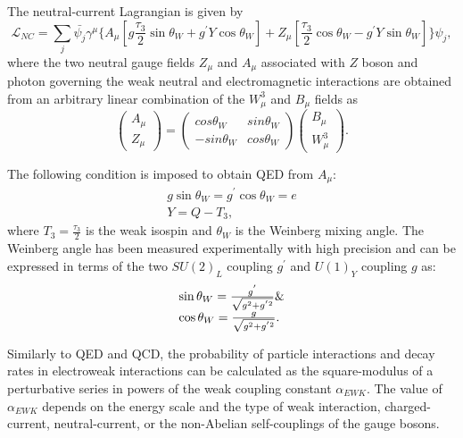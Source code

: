 The neutral-current Lagrangian is given by 
\begin{equation}
\mathcal{L}_{NC} = \sum_{j}{ \bar{\psi_{j}} \gamma^{\mu} \{ A_{\mu} [ g \frac{\tau_{3}}{2} \sin\theta_{W} + g^{'} Y \cos\theta_{W} ] + Z_{\mu} [ \frac{\tau_{3}}{2} \cos\theta_{W} - g^{'} Y \sin\theta_{W}] \} \psi_{j} },
\label{eqn:SU2NCLag}
\end{equation}
where the two neutral gauge fields $Z_{\mu}$ and $A_{\mu}$ associated with $Z$ boson and photon governing the weak neutral and electromagnetic interactions are obtained from an arbitrary linear combination of the $W^{3}_{\mu}$ and $B_{\mu}$ fields as 
\begin{equation}
\begin{pmatrix} A_{\mu} \\ Z_{\mu} \end{pmatrix} =  \begin{pmatrix} cos{\theta_{W}} & sin{\theta_{W}} \\ -sin{\theta_{W}} & cos{\theta_{W}} \end{pmatrix} \begin{pmatrix} B_{\mu} \\ W^{3}_{\mu} \end{pmatrix}.
\label{eqn:NeutralGaugeBosons}
\end{equation}

The following condition is imposed to obtain QED from $A_{\mu}$:
\begin{equation}
\begin{array}{l}
g \sin\theta_{W} = g^{'} \cos\theta_{W} = e \\ 
Y= Q - T_{3},
\end{array}
\label{eqn:QEDFromEWk}
\end{equation}
where $T_{3}=\frac{\tau_{3}}{2}$ is the weak isospin and $\theta_{W}$ is the Weinberg mixing angle. The Weinberg angle has been measured experimentally with high precision and can be expressed in terms of the two $SU(2)_{L}$ coupling $g^{'}$ and $U(1)_{Y}$ coupling $g$ as:
\begin{equation}
\begin{array}{l}
\sin\theta_{W} = \frac{g^{'}}{\sqrt{g^{2} +  g^{'2} }} $\&$ \\ \cos\theta_{W} = \frac{g}{\sqrt{g^{2} +  g^{'2} }}.
\end{array}
\label{eqn:WeinbergAngle}
\end{equation}

Similarly to QED and QCD, the probability of particle interactions and decay rates in electroweak interactions can be calculated as the square-modulus of a perturbative series in powers of the weak coupling constant $\alpha _{EWK}$. The value of $\alpha _{EWK}$ depends on the energy scale and the type of weak interaction, charged-current, neutral-current, or the non-Abelian self-couplings of the gauge bosons. 

